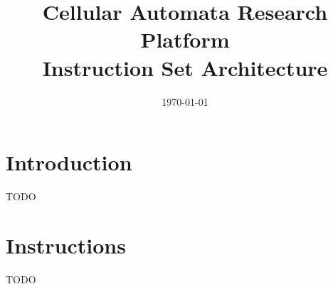 \documentclass[a4paper]{article}
\title{Cellular Automata Research Platform\\Instruction Set Architecture}
\date{\today}
\begin{document}
\maketitle

\tableofcontents

\newpage

\setcounter{page}{1}

\section{Introduction}

TODO

\newpage

\section{Instructions}

TODO
\end{document}
